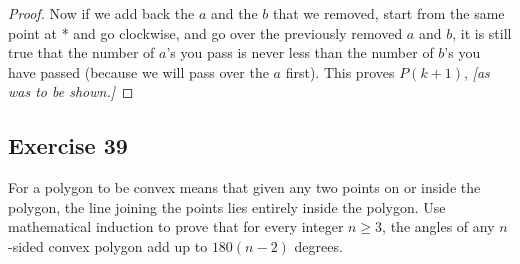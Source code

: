 \documentclass[14pt]{extarticle}
\begin{document}
\begin{proof}
Now if we add back the $a$ and the $b$ that we removed, start from the same point at * and go clockwise, and go over the previously removed $a$ and $b$, it is still true that the number of $a$'s you pass is never less than the number of $b$'s you have passed (because we will pass over the $a$ first). This proves $P(k+1)$, {\it [as was to be shown.]}
\end{proof}

\subsection{Exercise 39}
For a polygon to be convex means that given any two points on or inside the polygon, the line joining the points lies entirely inside the polygon. Use mathematical induction to prove that for every integer $n \geq 3$, the angles of any $n$-sided convex polygon add up to $180(n - 2)$ degrees.
\end{document}
